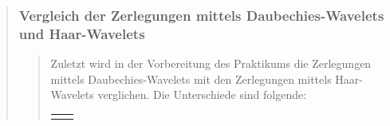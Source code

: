 \begin{quote}
\begin{quote}
        
        \end{quote}%
        
        
        \subsubsection{Vergleich der Zerlegungen mittels
        Daubechies-Wavelets und Haar-Wavelets}
        \begin{quote}
        
        Zuletzt wird in der Vorbereitung des Praktikums die Zerlegungen mittels
        Daubechies-Wavelets mit den Zerlegungen mittels Haar-Wavelets
        verglichen. Die Unterschiede sind folgende:
        
        \begin{center}
                \begin{tabular}{ll}
    
                \hspace{-12em}
                    \begin{minipage}{0.6\textwidth}
    

\end{minipage}
\end{tabular}
\end{center}
\end{quote}
\end{quote}
